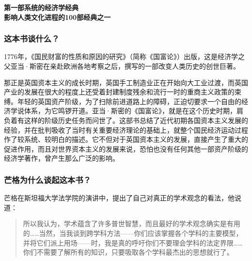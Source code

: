 \cleardoublepage
{}


\begin{BookSummaryBox}
{\centering \textbf{第一部系统的经济学经典\\ 影响人类文化进程的100部经典之一}\par}
\end{BookSummaryBox}

\subsubsection*{这本书谈什么？}

1776年，《国民财富的性质和原因的研究》（简称《国富论》）出版，这是经济学之父亚当·斯密在亲赴欧洲各地考察之后，撰写的一部改变人类历史的创世巨著。
\par

那正是英国资本主义的成长时期，英国手工制造业正在开始向大工业过渡，而英国产业的发展在很大的程度上还受着封建制度残余和流行一时的重商主义政策的束缚。年轻的英国资产阶级，为了扫除前进道路上的障碍，正迫切要求一个自由的经济学说体系，为它鸣锣开道。亚当·斯密的《国富论》，就是在这个历史时期，肩负着有这样的阶级历史任务而问世了。这部书总结了近代初期各国资本主义发展的经验，并在批判吸收了当时有关重要经济理论的基础上，就整个国民经济运动过程作了较系统、较明白的描述。它不但对于英国资本主义的发展，直接产生了重大的促进作用，而且对世界资本主义的发展来说，恐怕也没有任何其他一部资产阶级的经济学著作，曾产生那么广泛的影响。
\par

\subsubsection*{芒格为什么谈起这本书？}

芒格在斯坦福大学法学院的演讲中，提出了自己对真正的学术观念的看法，他说道：
\par

\begin{quotation}
所以我认为，学术蕴含了许多普世智慧，而且最好的学术观念确实是有用的……当然，当我谈到跨学科方法——你们应该掌握各个学科的主要模型，并将它们派上用场——时，我是真的呼吁你们不要理会学科的法定界限……你们不需要了解所有的知识，只要吸取各个学科最杰出的思想就行了。
\par
\end{quotation}

